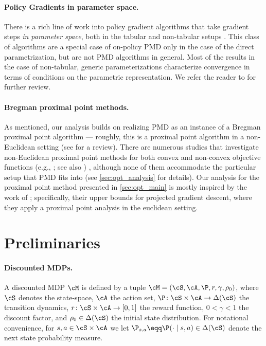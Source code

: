 \paragraph{Policy Gradients in parameter space.} 
There is a rich line of work into policy gradient algorithms that take gradient steps \emph{in parameter space}, both in the tabular and non-tabular setups \citep{zhang2020global,mei2020global, mei2021leveraging,yuan2022general,mu2024second}. This class of algorithms are a special case of on-policy PMD only in the case of the direct parametrization, but are not PMD algorithms in general. Most of the results in the case of non-tabular, generic parameterizations characterize convergence in terms of conditions on the parametric representation. We refer the reader to \citet{yuan2022general} for further review.

\paragraph{Bregman proximal point methods.}
As mentioned, our analysis builds on realizing PMD as an instance of a Bregman proximal point algorithm --- roughly, this is a proximal point algorithm \cite{rockafellar1976monotone} in a non-Euclidean setting (see \citet{teboulle2018simplified} for a review).
There are numerous studies that investigate non-Euclidean proximal point methods for both convex and non-convex objective functions
(e.g., \citealp{tseng2010approximation,ghadimi2016mini,bauschke2017descent,lu2018relatively,zhang2018convergence,fatkhullin2024taming}; see also \citealp{beck2017first})
, although none of them accommodate the particular setup that PMD fits into (see \cref{sec:opt_analysis} for details).
Our analysis for the proximal point method presented in \cref{sec:opt_main} is mostly inspired by the work of \citet{xiao2022convergence}; specifically, their upper bounds for projected gradient descent, where they apply a proximal point analysis in the euclidean setting. 


\section{Preliminaries}
\paragraph{Discounted MDPs.}
A discounted MDP $\cM$ is defined by a tuple
	$\cM = (\cS, \cA, \P, r, \gamma, \rho_0)$,
where $\cS$ denotes the state-space, $\cA$ the action set, $\P\colon \cS \times \cA \to \Delta(\cS)$ the transition dynamics, $r \colon \cS \times \cA \to [0, 1]$ the reward function, $0<\gamma< 1$ the discount factor, and $\rho_0\in \Delta(\cS)$ the initial state distribution.
For notational convenience, for $s,a\in \cS\times\cA$ we let $\P_{s, a} \eqq \P(\cdot \mid s, a) \in \Delta(\cS)$ denote the next state probability measure.

